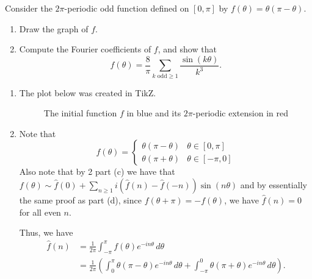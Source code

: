 \documentclass[12 pt, letterpaper]{hmcpset}
\begin{document}
\pagebreak

\begin{problem}[S \& S \S 2.6 \#4.]
	Consider the $2 \pi$-periodic odd function defined on $[0, \pi]$ by $f(\theta) = \theta(\pi - \theta)$.
	\begin{enumerate}
		\item Draw the graph of $f$.
		\item Compute the Fourier coefficients of $f$, and show that
			\[
				f(\theta) = \frac{8}{\pi} \sum_{k \text{ odd} \ge 1} \frac{\sin{(k \theta)}}{k^{3}}.
			\]	
	\end{enumerate}
\end{problem}

\begin{solution}
	\begin{enumerate}
		\item
			The plot below was created in TikZ.
			\begin{figure}[H]
				\centering
				\caption{The initial function $f$ in blue and its $2\pi$-periodic extension in red}
			\end{figure}
		\item Note that
			\[
				f(\theta) = \begin{cases}
					\theta (\pi - \theta) & \theta \in [0, \pi] \\
					\theta (\pi + \theta) & \theta \in [-\pi, 0]
				\end{cases}
			\]
			Also note that by 2 part (c) we have that $f(\theta) \sim \hat{f}(0) + \sum_{n \ge 1} i (\hat{f}(n) - \hat{f}(-n)) \sin{(n \theta)}$ and by essentially the same proof as part (d), since $f(\theta + \pi) = - f(\theta)$, we have $\hat{f}(n) = 0$ for all even $n$.

			Thus, we have
			\begin{align*}
				\hat{f}(n) & = \frac{1}{2 \pi} \int_{-\pi}^{\pi} f(\theta) e^{-i n \theta} \, d \theta \\
					   & = \frac{1}{2 \pi} \left ( \int_{0}^{\pi} \theta (\pi - \theta) e^{-i n \theta} \, d \theta + \int_{-\pi}^{0} \theta (\pi + \theta) e^{-i n \theta} \, d \theta \right ).
			\end{align*}


\end{enumerate}
\end{solution}
\end{document}
